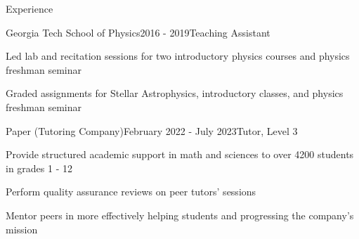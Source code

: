 \documentclass{resume} %
\begin{document}
\begin{rSection}{Experience}

\begin{rSubsection}{Georgia Tech School of Physics}{2016 - 2019}{Teaching Assistant}{}
\item Led lab and recitation sessions for two introductory physics courses and physics freshman seminar
\item Graded assignments for Stellar Astrophysics, introductory classes, and physics freshman seminar
\end{rSubsection}

\begin{rSubsection}{Paper (Tutoring Company)}{February 2022 - July 2023}{Tutor, Level 3}{}
\item Provide structured academic support in math and sciences to over 4200 students in grades 1 - 12
\item Perform quality assurance reviews on peer tutors' sessions
\item Mentor peers in more effectively helping students and progressing the company's mission
\end{rSubsection}







\end{rSection}
\end{document}
